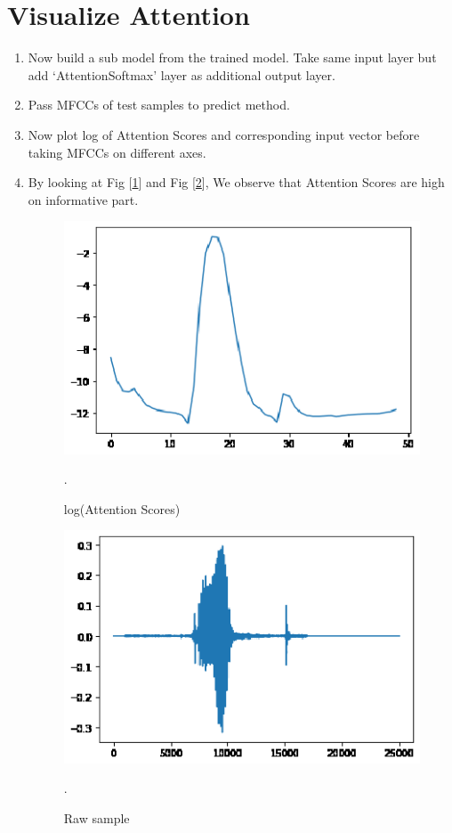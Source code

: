 \documentclass[11pt,english]{article}
\begin{document}
\section{Visualize Attention}
\begin{enumerate}
    \item Now build a sub model from the trained model. Take same input layer but add ‘AttentionSoftmax’ layer as additional output layer.
    \item Pass MFCCs of test samples to predict method.
    \item Now plot log of Attention Scores and corresponding input vector before taking MFCCs on different axes.
    \item By looking at Fig [\ref{fig: Attention}] and Fig [\ref{fig: Sample}], We observe that Attention Scores are high on informative part.
    \begin{figure}[!ht]
    \centering
    \includegraphics[width=\columnwidth]{./Figs/Attention.eps}
    \caption{ log(Attention Scores)}.
    \label{fig: Attention}	
    \end{figure}
    \begin{figure}[!ht]
    \centering
    \includegraphics[width=\columnwidth]{./Figs/Sample.eps}
    \caption{ Raw sample}.
    \label{fig: Sample}	
    \end{figure}
    
\end{enumerate}
\end{document}
